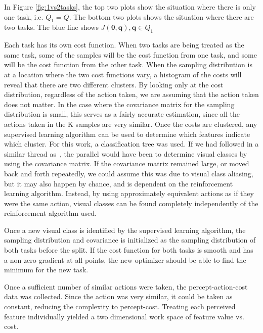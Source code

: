\documentclass[12pt]{article}
\newcommand{\mymath}[1]{\ensuremath{#1}\xspace}
\newcommand{\app}    {\mymath{\bm{\theta}}}
\newcommand{\taskp}  {\mymath{\mathbf{q}}}
\newcommand{\taskpsp}{\mymath{Q}}
\newcommand{\costf}  {\mymath{J}}
\begin{document}
In Figure \ref{fig:1vs2tasks}, the top two plots show the situation where there is only one task, i.e. $\taskpsp_1 = \taskpsp$. The bottom two plots shows the situation where there are two tasks. The blue line shows $\costf(\app,\taskp), \taskp \in \taskpsp_1$

\color{red}Each task has its own cost function. When two tasks are being treated as the same task, some of the samples will be the cost function from one task, and some will be the cost function from the other task. \color{black} When the sampling distribution is at a location where the two cost functions vary, a histogram of the costs will reveal that there are two different clusters. By looking only at the cost distribution, regardless of the action taken, we are assuming that the action taken does not matter. In the case where the covariance matrix for the sampling distribution is small, this serves as a fairly accurate estimation, since all the actions taken in the K samples are very similar. Once the costs are clustered, any supervised learning algorithm can be used to determine which features indicate which cluster. For this work, a classification tree was used. If we had followed in a similar thread as~\citet{piater11learning}, the parallel would have been to determine visual classes by using the covariance matrix. If the covariance matrix remained large, or moved back and forth repeatedly, we could assume this was due to visual class aliasing, but it may also happen by chance, and is dependent on the reinforcement learning algorithm. Instead, by using approximately equivalent actions as if they were the same action, visual classes can be found completely independently of the reinforcement algorithm used. 

Once a new visual class is identified by the supervised learning algorithm, the sampling distribution and covariance is initialized as the sampling distribution of both tasks before the split. If the cost function for both tasks is smooth and has a non-zero gradient at all points, the new optimizer should be able to find the minimum for the new task. 





Once a sufficient number of similar actions were taken, the percept-action-cost data was collected. Since the action was very similar, it could be taken as constant, reducing the complexity to percept-cost. Treating each perceived feature individually yielded a two dimensional work space of feature value vs. cost. 
\end{document}
